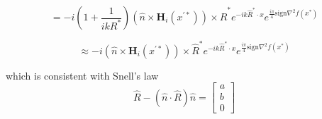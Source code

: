 \documentclass{article}
\theoremstyle{plain}
\begin{document}
\begin{equation} %
	=
	-i\left( 1 + \frac{1}{ikR^*} \right)
	\left( \hat{n} \times \mathbf{H}_i(x^{'*}) \right) \times \hat{R}^*
	e^{-ik\hat{R}^*\cdot x}
	e^{\frac{i\pi}{4}\text{sign}\nabla^2 f(x^*)}
\end{equation}

\begin{equation} %
	\approx
	-i
	\left( \hat{n} \times \mathbf{H}_i(x^{'*}) \right) \times \hat{R}^*
	e^{-ik\hat{R}^*\cdot x}
	e^{\frac{i\pi}{4}\text{sign}\nabla^2 f(x^*)}
\end{equation}





which is consistent with Snell's law
\begin{equation}
	\hat{R} - \left( \hat{n}\cdot\hat{R} \right)\hat{n} = 
	\begin{bmatrix}
		a \\
		b \\
		0
	\end{bmatrix}
\end{equation}
\end{document}
